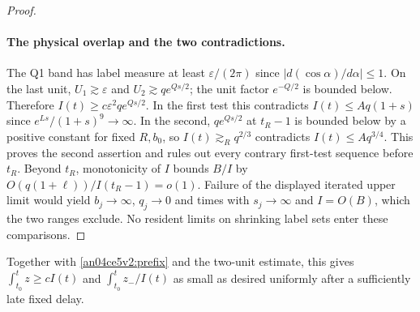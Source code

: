 \documentclass[11pt]{article}
\newcommand{\eps}{\varepsilon}
\begin{document}
\begin{proof}
\paragraph{The physical overlap and the two contradictions.}
The Q1 band has label measure at least $\eps/(2\pi)$ since $|d(\cos\alpha)/d\alpha|\le1$. On the last unit, $U_1\gtrsim\eps$ and $U_2\gtrsim q e^{Qs/2}$; the unit factor $e^{-Q/2}$ is bounded below. Therefore $I(t)\ge c\eps^2 q e^{Qs/2}$. In the first test this contradicts $I(t)\le A q(1+s)$ since $e^{Ls}/(1+s)^9\to\infty$. In the second, $q e^{Qs/2}$ at $t_R-1$ is bounded below by a positive constant for fixed $R,b_0$, so $I(t)\gtrsim_R q^{2/3}$ contradicts $I(t)\le A q^{3/4}$. This proves the second assertion and rules out every contrary first-test sequence before $t_R$. Beyond $t_R$, monotonicity of $I$ bounds $B/I$ by $O(q(1+\ell))/I(t_R-1)=o(1)$. Failure of the displayed iterated upper limit would yield $b_j\to\infty$, $q_j\to0$ and times with $s_j\to\infty$ and $I=O(B)$, which the two ranges exclude. No resident limits on shrinking label sets enter these comparisons.
\end{proof}
Together with \eqref{an04ce5v2:prefix} and the two-unit estimate, this gives $\int_{t_0}^t z\ge c I(t)$ and $\int_{t_0}^t z_-/I(t)$ as small as desired uniformly after a sufficiently late fixed delay.
\end{document}
